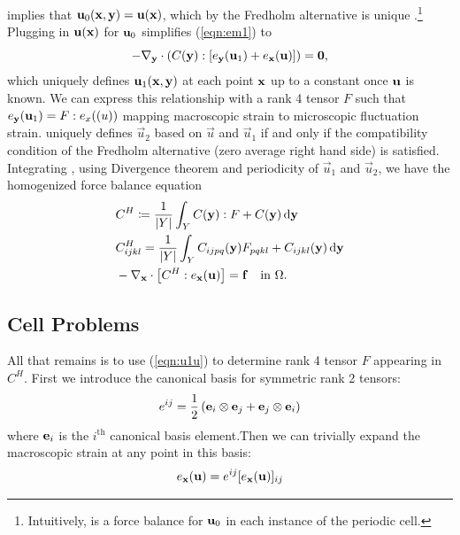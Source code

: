 \documentclass[twocolumn,10pt]{article}
\begin{document}
 implies that ${\bf u}_0({\mathbf x}, {\mathbf y}) = {\bf u}({\bf
  x})$, which by the Fredholm alternative is unique \cite[Lemma
  2.3.21]{allaire2002shape}.\footnote{Intuitively,  is a
  force balance for ${\bf u}_0$ in each instance of the periodic
  cell.} Plugging in ${\bf u}({\mathbf x})$ for ${\bf u}_0$ simplifies
(\ref{eqn:em1}) to
\begin{equation}
    \label{eqn:u1u}
    -\nabla_{\mathbf y} \cdot (C({\mathbf y}) : [e_{\mathbf y}({\bf u}_1) + e_{\mathbf x}({\bf u})]) =  {\bf 0},
\end{equation}
which uniquely defines ${\bf u}_1({\mathbf x}, {\mathbf y})$ at each point
${\mathbf x}$ up to a constant once ${\bf u}$ is known. We can express this
relationship with a rank 4 tensor $F$ such that $e_{\mathbf y}(\mathbf u_1) =
F:e_x(\mathbf (u))$ mapping macroscopic strain to microscopic fluctuation
strain.  uniquely defines $\vec{u}_2$ based on $\vec{u}$
and $\vec{u}_1$ if and only if the compatibility condition of the
Fredholm alternative (zero average right hand side) is
satisfied. Integrating , using Divergence theorem and
periodicity of $\vec{u}_1$ and $\vec{u}_2$, we have the homogenized
force balance equation
\begin{align}
  &C^H \coloneqq \frac{1}{|Y|} \int_Y C({\mathbf y}) : F + C({\mathbf y}) \, \mathrm{d} {\mathbf y}  \\
  &C^H_{ijkl} = \frac{1}{|Y|} \int_Y C_{ijpq}({\mathbf y}) F_{pqkl} + C_{ijkl}({\mathbf y}) \, \mathrm{d} {\mathbf y}\\
  &-\nabla_{\mathbf x} \cdot \left[ C^H : e_{\mathbf x}({\bf u}) \right] = {\bf f} \quad \text{in } \Omega.
\end{align}

\subsection{Cell Problems}
All that remains is to use (\ref{eqn:u1u}) to determine rank 4 tensor $F$
appearing in $C^H$. First we introduce the canonical basis for symmetric rank 2 tensors:
$$
e^{ij} = \frac{1}{2} \left({\bf e}_i \otimes {\bf e}_j + {\bf e}_j \otimes {\bf e}_i \right)
$$
where ${\bf e}_i$ is the $i^\text{th}$ canonical basis element.Then we
can trivially expand the macroscopic strain at any point in this
basis:
$$
e_{\mathbf x}({\bf u}) = e^{ij} [e_{\mathbf x}({\bf u})]_{ij}
$$
\end{document}

